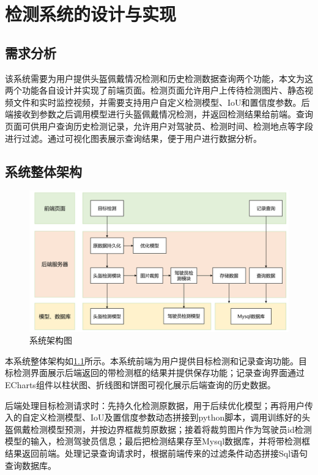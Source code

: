 \chapter{检测系统的设计与实现}

\section{需求分析}
该系统需要为用户提供头盔佩戴情况检测和历史检测数据查询两个功能，本文为这两个功能各自设计并实现了前端页面。检测页面允许用户上传待检测图片、静态视频文件和实时监控视频，并需要支持用户自定义检测模型、IoU和置信度参数。后端接收到参数之后调用模型进行头盔佩戴情况检测，并返回检测结果给前端。查询页面可供用户查询历史检测记录，允许用户对驾驶员、检测时间、检测地点等字段进行过滤。通过可视化图表展示查询结果，便于用户进行数据分析。

\section{系统整体架构}
\begin{figure}[!htb]
    \centering
    \includegraphics[width=1\textwidth]{figs/chap05/struct.png}
    \caption{系统架构图}
    \label{fig:struct}
\end{figure}
本系统整体架构如\ref{fig:struct}所示。本系统前端为用户提供目标检测和记录查询功能。目标检测界面展示后端返回的带检测框的结果并提供保存功能；记录查询界面通过ECharts组件以柱状图、折线图和饼图可视化展示后端查询的历史数据。

后端处理目标检测请求时：先持久化检测原数据，用于后续优化模型；再将用户传入的自定义检测模型、IoU及置信度参数动态拼接到python脚本，调用训练好的头盔佩戴检测模型预测，并按边界框裁剪原数据；接着将裁剪图片作为驾驶员id检测模型的输入，检测驾驶员信息；最后把检测结果存至Mysql数据库，并将带检测框结果返回前端。处理记录查询请求时，根据前端传来的过滤条件动态拼接Sql语句查询数据库。

